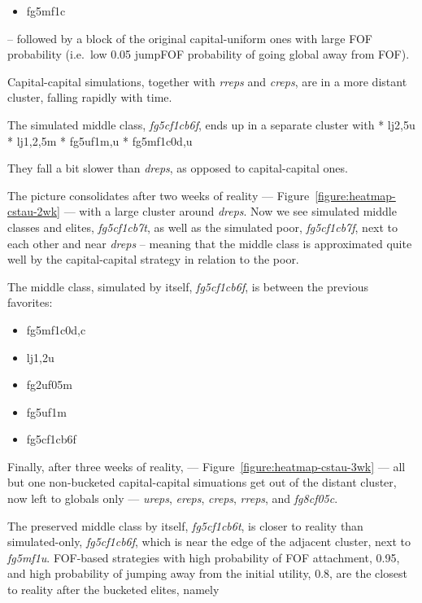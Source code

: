 \documentclass[10pt,oneside]{memoir}
\begin{document}
\begin{Spacing}{2}
\begin{itemize}
\item fg5mf1c
\end{itemize}

-- followed by a block of the original capital-uniform ones with large FOF probability (i.e.\ low 0.05 jumpFOF probability of going global away from FOF).


Capital-capital simulations, together with {\itshape rreps} and {\itshape creps}, are in a more distant cluster, falling rapidly with time.


The simulated middle class, {\itshape fg5cf1cb6f}, ends up in a separate cluster with
* lj{2,5}u
* lj{1,2,5}m
* fg5uf1{m,u}
* fg5mf1{c0d,u}


They fall a bit slower than {\itshape dreps}, as opposed to capital-capital ones.


The picture consolidates after two weeks of reality --- Figure~\ref{figure:heatmap-cstau-2wk} --- with a large cluster around {\itshape dreps}.  Now we see simulated middle classes and elites, {\itshape fg5cf1cb7t}, as well as the simulated poor, {\itshape fg5cf1cb7f}, next to each other and near {\itshape dreps} -- meaning that the middle class is approximated quite well by the capital-capital strategy in relation to the poor.  


The middle class, simulated by itself, {\itshape fg5cf1cb6f}, is between the previous favorites:


\begin{itemize}


\item fg5mf{1c0d,c}

\item lj{1,2}u

\item fg2uf05m

\item fg5uf1m

\item fg5cf1cb6f
\end{itemize}

Finally, after three weeks of reality, --- Figure~\ref{figure:heatmap-cstau-3wk} --- all but one non-bucketed capital-capital simuations get out of the distant cluster, now left to globals only --- {\itshape ureps}, {\itshape ereps}, {\itshape creps}, {\itshape rreps}, and {\itshape fg8cf05c}.


The preserved middle class by itself, {\itshape fg5cf1cb6t}, is closer to reality than simulated-only, {\itshape fg5cf1cb6f}, which is near the edge of the adjacent cluster, next to {\itshape fg5mf1u}.  FOF-based strategies with high probability of FOF attachment, 0.95,  and high probability of jumping away from the initial utility, 0.8, are the closest to reality after the bucketed elites, namely



\end{Spacing}
\end{document}
